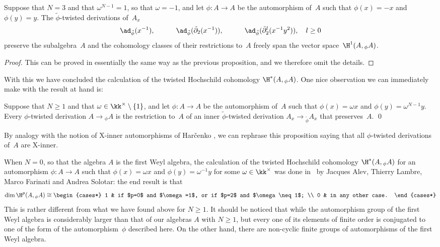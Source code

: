 \begin{Proposition}
Suppose that $N=3$ and that $\omega^{N-1}=1$, so that $\omega=-1$, and let
$\phi:A\to A$ be the automorphism of~$A$ such that $\phi(x)=-x$ and
$\phi(y)=y$. The $\tilde\phi$-twisted
derivations of~$A_x$  
  \[
  \ad_{\tilde\phi}(x^{-1}),
  \qquad\quad
  \ad_{\tilde\phi}(\tilde\partial_2(x^{-1})),
  \qquad\quad
  \ad_{\tilde\phi}(\tilde\partial_2^l(x^{-1}y^2)), \quad l\geq0
  \]
preserve the subalgebra~$A$ and the cohomology classes of their
restrictions to~$A$ freely span the vector space~$\H^1(A,{}_\phi A)$.
\end{Proposition}

\begin{proof}
This can be proved in essentially the same way as the previous proposition,
and we therefore omit the details.
\end{proof}

With this we have concluded the calculation of the twisted Hochschild
cohomology $\H^*(A,{}_\phi A)$. One nice observation we can immediately
make with the result at hand is:

\begin{Proposition}\label{prop:der:xinner}
Suppose that $N\geq1$ and that $\omega\in\kk^\times\setminus\{1\}$, and let
$\phi:A\to A$ be the automorphism of~$A$ such that $\phi(x)=\omega x$ and
$\phi(y)=\omega^{N-1}y$. Every $\phi$-twisted derivation $A\to{}_\phi A$ is
the restriction to~$A$ of an inner $\tilde\phi$-twisted derivation
$A_x\to{}_{\tilde\phi} A_x$ that preserves~$A$. \qed
\end{Proposition}

By analogy with the notion of X-inner automorphisms of Har\v{c}enko
, we can rephrase this
proposition saying that all $\phi$-twisted derivations of~$A$ are X-inner.

\bigskip

When $N=0$, so that the algebra $A$ is the first Weyl
algebra, the calculation of the twisted Hochschild cohomology
$\H^*(A,{}_\phi A)$ for an automorphism $\phi:A\to A$ such that
$\phi(x)=\omega x$ and $\phi(y)=\omega^{-1}y$ for some
$\omega\in\kk^\times$ was done in~\cite{AFLS} by Jacques Alev, Thierry
Lambre, Marco Farinati and Andrea Solotar: the end result is that
  \[
  \dim\H^p(A,{}_\phi A) \cong 
    \begin{cases*}
    1 & if $p=0$ and $\omega=1$, or if $p=2$ and $\omega\neq1$; \\
    0 & in any other case.
    \end{cases*}
  \]
This is rather different from what we have found above for $N\geq1$. It
should be noticed that while the automorphism group of the first Weyl
algebra is considerably larger than that of our algebras $A$ with $N\geq1$,
but every one of its elements of finite order is conjugated to one of
the form of the automorphism~$\phi$ described here. On the other hand,
there are non-cyclic finite groups of automorphisms of the first Weyl
algebra.
